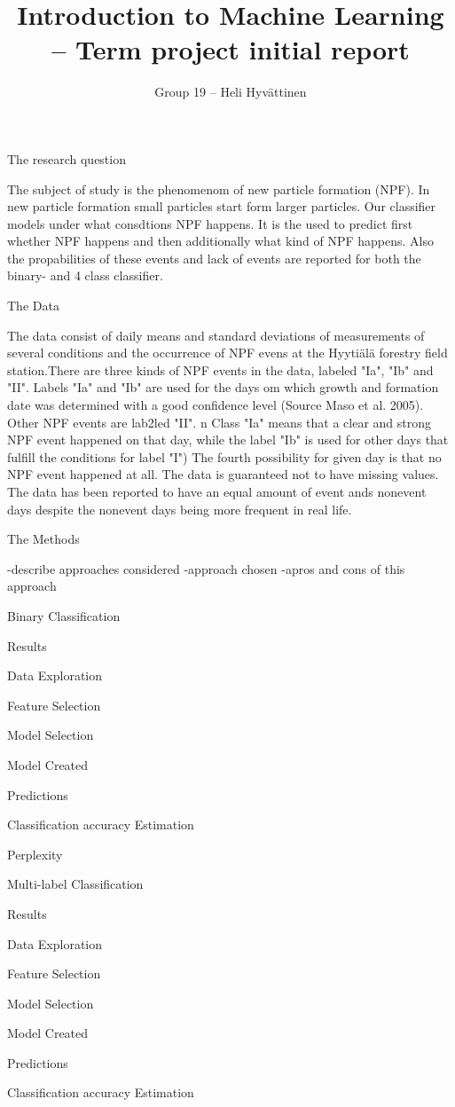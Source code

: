 \documentclass[a4size, 12pt]{report}
\begin{document}
	
	\author{Group 19 – Heli Hyvättinen}
	\title{Introduction to Machine Learning – Term project initial report }
	
	The research question
	
	The subject of study is the phenomenom of new particle formation (NPF). In new particle formation small particles start form larger particles. Our classifier models under what consdtions NPF happens. It is the used to predict first whether NPF happens and then additionally what kind of NPF happens. Also the propabilities of these events and lack of events are reported for both the binary- and 4 class classifier.  
	     
	
	The Data
	
	The data consist of daily means and standard deviations of measurements of several conditions and the occurrence of NPF evens at the Hyytiälä forestry field station.There are three kinds of NPF events in the data, labeled "Ia", "Ib" and "II". Labels "Ia" and "Ib" are used for the days om which growth and formation date was determined with a good confidence level (Source Maso et al. 2005). Other NPF events are lab2led "II".
	n  Class "Ia" means that a clear and strong NPF event happened on that day, while the label "Ib" is used for other days that fulfill the conditions for label "I")  The fourth possibility for given day is that no NPF event happened at all. The data is guaranteed not to have missing values. The data has been reported to have an equal amount of event ands nonevent days despite the nonevent days being more frequent in real life.
	
	The Methods
		
	-describe approaches considered
	-approach chosen
	-apros and cons of this approach
	
	Binary Classification
	
		Results
	
	Data Exploration
	
	Feature Selection
	
	Model Selection
	
	Model Created
	
	Predictions
	
	Classification accuracy Estimation
	
	Perplexity
	
	Multi-label Classification
	
	
	Results
	
	Data Exploration
	
	Feature Selection
	
	Model Selection
	
	Model Created
	
	Predictions
	
	Classification accuracy Estimation
	
	
	     
\end{document}
